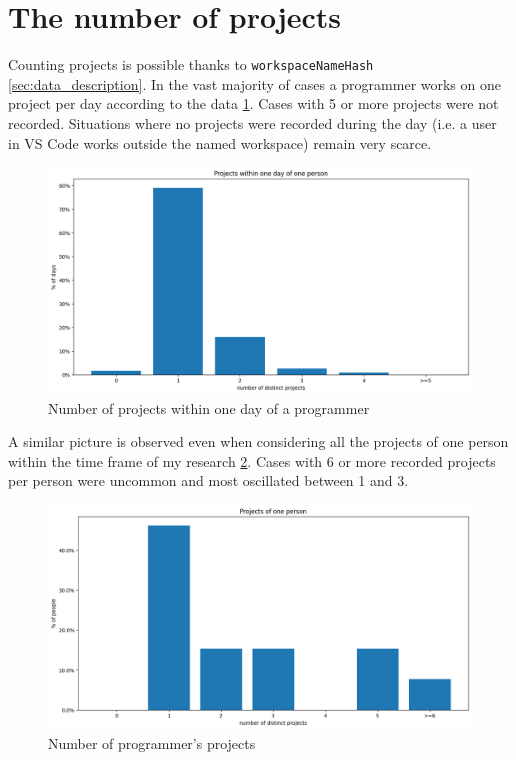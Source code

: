 \section{The number of projects}

Counting projects is possible thanks to \texttt{workspaceNameHash} \ref{sec:data_description}. In the vast majority of cases a programmer works on one project per day according to the data \ref{fig:projects_per_day}. Cases with 5 or more projects were not recorded. Situations where no projects were recorded during the day (i.e. a user in VS Code works outside the named workspace) remain very scarce.

\begin{figure}[htbp]
  \centering
  \includegraphics[scale=0.5]{chapters/results/graphics/projects-day.png}
  \caption{Number of projects within one day of a programmer}
  \label{fig:projects_per_day}
\end{figure}

A similar picture is observed even when considering all the projects of one person within the time frame of my research \ref{fig:projects_per_person}. Cases with 6 or more recorded projects per person were uncommon and most oscillated between 1 and 3.

\begin{figure}[htbp]
  \centering
  \includegraphics[scale=0.5]{chapters/results/graphics/projects-one-person.png}
  \caption{Number of programmer's projects}
  \label{fig:projects_per_person}
\end{figure}


